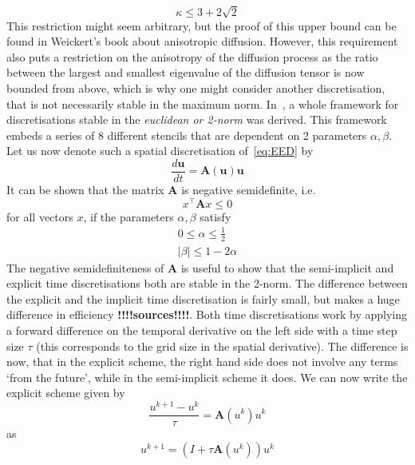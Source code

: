 \begin{equation}
    \kappa \leq 3 + 2\sqrt{2}
\end{equation}
This restriction might seem arbitrary, but the proof of this upper bound can be found in
Weickert's book about anisotropic diffusion\cite{weickert96}.
However, this requirement also puts a restriction on the anisotropy of the diffusion process as the
ratio between the largest and smallest eigenvalue of the diffusion tensor is now bounded from
above, which is why one might consider another discretisation, that is not necessarily stable in
the maximum norm.
In~\cite{www13}, a whole framework for discretisations stable in the
\textit{euclidean or 2-norm} was derived. This framework embeds a series of 8 different
stencils that are dependent on 2 parameters $\alpha, \beta$. Let us now denote such a spatial
discretisation of~\eqref{eq:EED} by 
\begin{equation}
    \frac{d\mathbf{u}}{dt} = \mathbf{A}(\mathbf{u})\mathbf{u}
\end{equation}
It can be shown that the matrix $\mathbf{A}$ is negative semidefinite, i.e. 
\begin{equation*}
    x^\top \mathbf{A}x \leq 0
\end{equation*}
for all vectors $x$, if the parameters $\alpha,\beta$ satisfy
\begin{eqnarray}
    0 \leq \alpha \leq \frac{1}{2}\\
    \vert\beta\vert \leq 1-2\alpha
\end{eqnarray}
The negative semidefiniteness of $\mathbf{A}$ is useful to show that the semi-implicit and
explicit time discretisations both are stable in the 2-norm.
The difference between the explicit and the implicit time discretisation is fairly small, but makes
a huge difference in efficiency \textbf{!!!!sources!!!!}. Both time discretisations work by applying a forward difference on
the temporal derivative on the left side with a time step size $\tau$ (this corresponds to the grid
size in the spatial derivative). 
The difference is now, that in the explicit scheme, the right hand side does not involve any terms
`from the future', while in the semi-implicit scheme it does.
We can now write the explicit scheme given by
\begin{equation}
    \frac{u^{k+1} - u^{k}}{\tau} = \mathbf{A}(u^k)u^k
\end{equation}
as
\begin{equation}
    u^{k+1} = (I + \tau\mathbf{A}(u^k))u^k
\end{equation}
